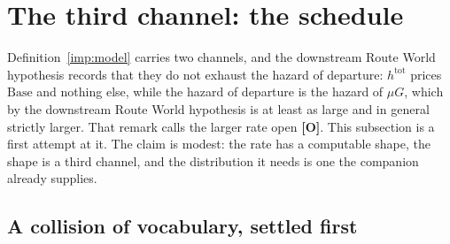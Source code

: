 
\section{The third channel: the schedule}\label{sec:schedule}


Definition~\ref{imp:model} carries two channels, and
the downstream Route World hypothesis records that they do not exhaust the
hazard of departure: $h^{\mathrm{tot}}$ prices $\mathrm{Base}$ and
nothing else, while the hazard of departure is the hazard of $\mu G$,
which by the downstream Route World hypothesis is at least as large and in general
strictly larger. That remark calls the larger rate open \textbf{[O]}. This subsection is a first attempt at it. The claim is modest: the rate
has a computable shape, the shape is a third channel, and the
distribution it needs is one the companion already supplies.

\subsection{A collision of vocabulary, settled first}
\label{sch:subsub:vocab}

